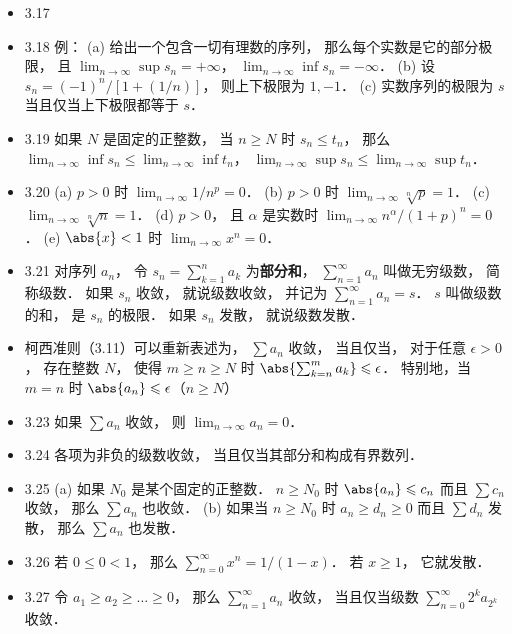 \begin{itemize}
\item 3.17 

\item 3.18 例： (a) 给出一个包含一切有理数的序列， 那么每个实数是它的部分极限， 且 $\lim_{n\to\infty}\sup s_n = +\infty$， $\lim_{n\to\infty}\inf s_n = -\infty$． (b) 设 $s_n = (-1)^n/[1+(1/n)]$， 则上下极限为 $1,-1$． (c) 实数序列的极限为 $s$ 当且仅当上下极限都等于 $s$．

\item 3.19 如果 $N$ 是固定的正整数， 当 $n\geqslant N$ 时 $s_n \leqslant t_n$， 那么 $\lim_{n\to\infty}\inf s_n \leqslant \lim_{n\to\infty}\inf t_n$， $\lim_{n\to\infty}\sup s_n \leqslant \lim_{n\to\infty}\sup t_n$．

\item 3.20 (a) $p > 0$ 时 $\lim_{n\to\infty}1/n^p = 0$． (b) $p>0$ 时 $\lim_{n\to\infty}{}\sqrt[n]{p} = 1$． (c) $\lim_{n\to\infty} \sqrt[n]{n} = 1$． (d) $p>0$， 且 $\alpha$ 是实数时 $\lim_{n\to\infty} n^\alpha/(1+p)^n = 0$． (e) $\abs{x}<1$ 时 $\lim_{n\to\infty} x^n = 0$．

\item 3.21 对序列 ${a_n}$， 令 $s_n = \sum_{k=1}^n a_k$ 为\textbf{部分和}， $\sum_{n=1}^\infty a_n$ 叫做无穷级数， 简称级数． 如果 $s_n$ 收敛， 就说级数收敛， 并记为 $\sum_{n=1}^\infty a_n = s$． $s$ 叫做级数的和， 是 $s_n$ 的极限． 如果 $s_n$ 发散， 就说级数发散．

\item 柯西准则（3.11）可以重新表述为， $\sum a_n$ 收敛， 当且仅当， 对于任意 $\epsilon>0$， 存在整数 $N$， 使得 $m \geqslant n \geqslant N$ 时 $\abs{\sum_{k=n}^m a_k} \leqslant \epsilon$． 特别地，当 $m=n$ 时 $\abs{a_n}\leqslant\epsilon$（$n\geqslant N$）

\item 3.23 如果 $\sum a_n$ 收敛， 则 $\lim_{n\to\infty} a_n = 0$．

\item 3.24 各项为非负的级数收敛， 当且仅当其部分和构成有界数列．

\item 3.25 (a) 如果 $N_0$ 是某个固定的正整数． $n \geqslant N_0$ 时 $\abs{a_n}\leqslant c_n$ 而且 $\sum c_n$ 收敛， 那么 $\sum a_n$ 也收敛． (b) 如果当 $n\geqslant N_0$ 时 $a_n\geqslant d_n\geqslant 0$ 而且 $\sum d_n$ 发散， 那么 $\sum a_n$ 也发散．

\item 3.26 若 $0\leqslant 0< 1$， 那么 $\sum_{n=0}^\infty x^n = 1/(1-x)$． 若 $x\geqslant 1$， 它就发散．

\item 3.27 令 $a_1\geqslant a_2\geqslant \dots \geqslant 0$， 那么 $\sum_{n=1}^\infty a_n$ 收敛， 当且仅当级数 $\sum_{n=0}^\infty 2^k a_{2^k}$ 收敛．


\end{itemize}
